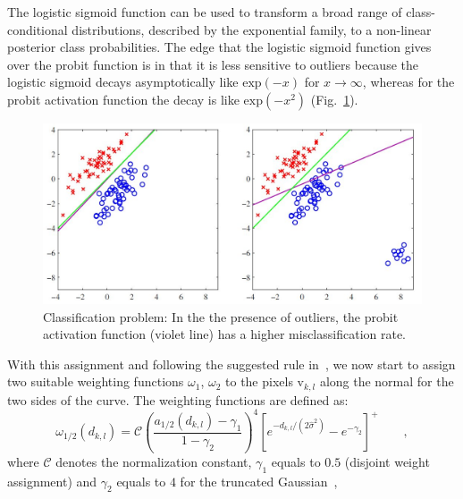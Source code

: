 \documentclass[conference]{IEEEtran}
\begin{document}
The logistic sigmoid function can be used to transform a broad range
of class-conditional distributions, described by the exponential
family, to a non-linear posterior class probabilities. The edge that the logistic
sigmoid function gives over the probit function is in that it is less sensitive to 
outliers because the logistic sigmoid decays asymptotically like $\mathrm{exp}(-x)$ for $x \rightarrow \infty$, whereas
for the probit activation function the decay is like
$\mathrm{exp}(-x^2)$ (Fig.~\ref{fig:outliers}).
\begin{figure} 
  \includegraphics[width=\columnwidth]{outliers.jpg}
\caption{Classification problem: 
In the the presence of outliers, the probit activation
function (violet line) has a higher misclassification rate.}
\label{fig:outliers}
\end{figure}

With this assignment and following the suggested rule in~\cite{hanek2004contracting}, 
we now start to assign two suitable weighting functions
$\omega_1$, $\omega_2$ to the pixels $\mathrm{v}_{k,l}$ along the
normal for the two sides of the curve. The weighting functions are
defined as:
\begin{equation}
  \label{eq:weight}
  \omega_{1/2}(d_{k,l}) = \mathcal{C}\left(\frac{a_{1/2}(d_{k,l}) -
    \gamma_1}{1-\gamma_2}\right)^4 \left[e^{-d_{k,l}/(2\hat{\sigma}^2)} - e^{-\gamma_2}\right]^+\qquad,
\end{equation}
where $\mathcal{C}$ denotes the normalization constant, $\gamma_1$ equals to $0.5$ (disjoint weight assignment) and $\gamma_2$
equals to $4$ for the truncated Gaussian~\cite{hanek2004contracting},
\end{document}
